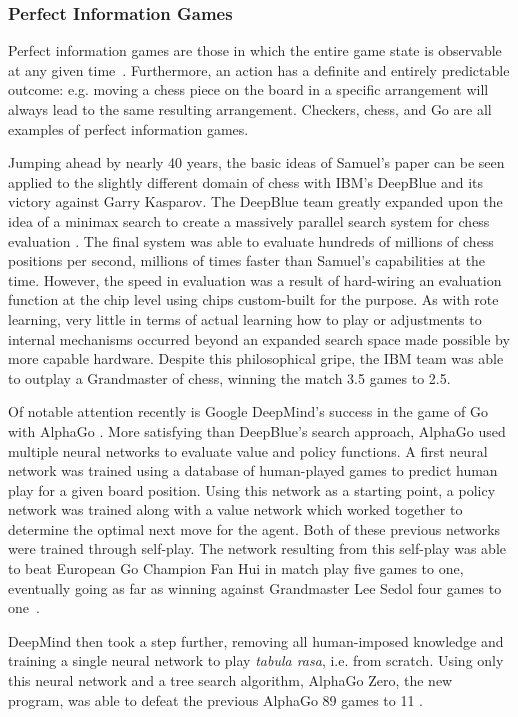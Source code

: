 

\subsubsection*{Perfect Information Games}

Perfect information games are those in which the entire game state is observable
at any given time~\cite{perfinfo}.
%
Furthermore,
an action has a definite and entirely predictable outcome:
e.g. moving a chess piece on the board in a specific arrangement will always
lead to the same resulting arrangement.
%
Checkers, chess, and Go are all examples of perfect information games.

Jumping ahead by nearly 40 years,
the basic ideas of Samuel's paper can be seen applied to the slightly different
domain of chess with IBM's DeepBlue
and its victory against Garry Kasparov.
%
The DeepBlue team greatly expanded upon the idea of a minimax search to create a
massively parallel search system for chess evaluation
\cite{ibm_deepblue}.
%
The final system was able to evaluate hundreds of millions of chess positions
per second,
millions of times faster than Samuel's capabilities at the time.
%
However,
the speed in evaluation was a result of hard-wiring an evaluation function at
the chip level using chips custom-built for the purpose.
%
As with rote learning,
very little in terms of actual learning how to play or adjustments to internal
mechanisms occurred
beyond an expanded search space made possible by more capable hardware.
%
Despite this philosophical gripe,
the IBM team was able to outplay a Grandmaster of chess,
winning the match 3.5 games to 2.5.


Of notable attention recently is Google DeepMind's
success in the game of Go with AlphaGo
\cite{deepmind_alphago}.
%
More satisfying than DeepBlue's search approach,
AlphaGo used multiple neural networks to evaluate value and policy functions.
%
A first neural network was trained using a database of human-played games
to predict human play for a given board position.
%
Using this network as a starting point,
a policy network was trained
along with a value network which worked together to determine the optimal next
move for the agent.
%
Both of these previous networks were trained through self-play.
%
The network resulting from this self-play was able to beat 
European Go Champion Fan Hui in match play
five games to one,
eventually going as far as winning against
Grandmaster Lee Sedol four games to one~\cite{deepmind_overview}.


DeepMind then took a step further,
removing all human-imposed knowledge and
training a single neural network to play \textit{tabula rasa}, i.e. from scratch.
%
Using only this neural network and a tree search algorithm,
AlphaGo Zero, the new program,
was able to defeat the previous AlphaGo 89 games to 11
\cite{deepmind_alphago_zero}.


